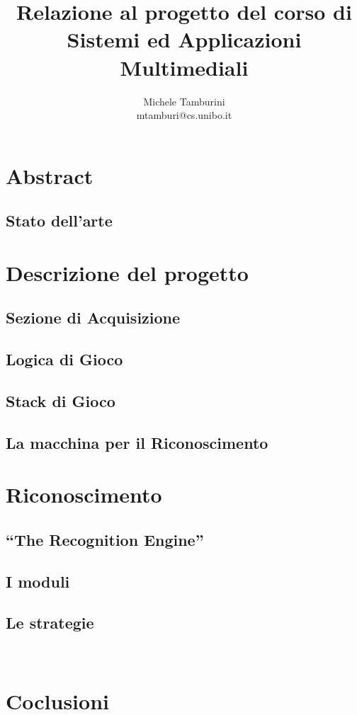 \documentclass[a4paper,10pt, twocolumn]{article}
\title{Relazione al progetto del corso di\\Sistemi ed Applicazioni Multimediali}
\author{Michele Tamburini \\ mtamburi@cs.unibo.it}
\begin{document}
\maketitle

\section{Abstract}
  \subsection{Stato dell'arte}
  
\section{Descrizione del progetto}
  \subsection{Sezione di Acquisizione}
  \subsection{Logica di Gioco}
  \subsection{Stack di Gioco}
  \subsection{La macchina per il Riconoscimento}
  
\section{Riconoscimento}
  \subsection{``The Recognition Engine''}
  \subsection{I moduli}
  \subsection{Le strategie}
  \

\section{}

\section{Coclusioni}


\clearpage

\nocite{*}



\end{document}
